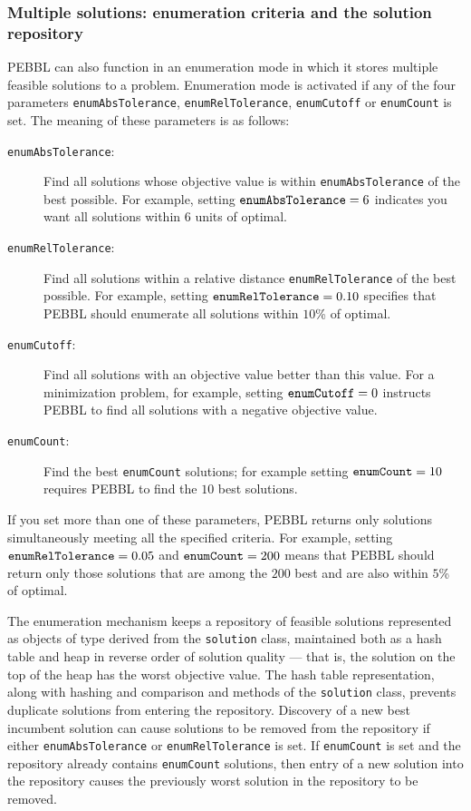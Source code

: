 \subsubsection{Multiple solutions: enumeration criteria
  and the solution repository}

PEBBL can also function in an enumeration mode in which it stores
multiple feasible solutions to a problem.  Enumeration mode is
activated if any of the four parameters \texttt{enumAbsTolerance},
\texttt{enumRelTolerance}, \texttt{enumCutoff} or
\texttt{enumCount} is set.  The meaning of these parameters is as
follows:
\begin{description}
\item[\texttt{enumAbsTolerance}:] Find all solutions whose objective
  value is within \texttt{enumAbsTolerance} of the best possible.  For
  example, setting $\text{\texttt{enumAbsTolerance}}=6$ indicates you
  want all solutions within $6$ units of optimal.
\item[\texttt{enumRelTolerance}:]  Find all solutions within a
  relative distance \texttt{enumRelTolerance} of the best possible.
  For example, setting $\text{\texttt{enumRelTolerance}}=0.10$ specifies
  that PEBBL should enumerate all solutions within $10$\% of optimal. 
\item[\texttt{enumCutoff}:]  Find all solutions with an objective
  value better than this value.  For a minimization problem, for
  example, setting $\text{\texttt{enumCutoff}}=0$ instructs PEBBL to
  find all solutions with a negative objective value.
\item[\texttt{enumCount}:]  Find the best \texttt{enumCount}
  solutions; for example setting $\text{\texttt{enumCount}}=10$
  requires PEBBL to find the $10$ best solutions.
\end{description}

If you set more than one of these parameters, PEBBL returns only
solutions simultaneously meeting all the specified criteria.  For
example, setting $\text{\texttt{enumRelTolerance}}=0.05$ and
$\text{\texttt{enumCount}}=200$ means that PEBBL should return only
those solutions that are among the $200$ best and are also within
$5$\% of optimal.

The enumeration mechanism keeps a repository of feasible solutions
represented as objects of type derived from the \texttt{solution}
class, maintained both as a hash table and heap in reverse order of
solution quality --- that is, the solution on the top of the heap has
the worst objective value.  The hash table representation, along with
hashing and comparison and methods of the \texttt{solution} class,
prevents duplicate solutions from entering the repository.  Discovery
of a new best incumbent solution can cause solutions to be removed
from the repository if either \texttt{enumAbsTolerance} or
\texttt{enumRelTolerance} is set.  If \texttt{enumCount} is set and
the repository already contains \texttt{enumCount} solutions, then
entry of a new solution into the repository causes the previously
worst solution in the repository to be removed.


